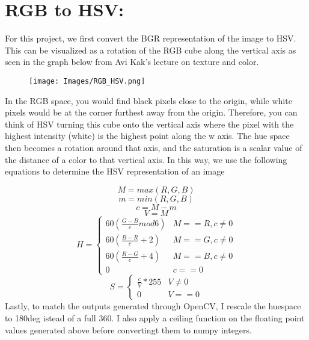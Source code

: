 \documentclass{article}
\begin{document}
\section{RGB to HSV:}
For this project, we first convert the BGR representation of the image to HSV. This can be visualized as a rotation of the RGB cube along the vertical axis as seen in the graph below from Avi Kak's lecture on texture and color.
\begin{figure}[H]
    \centering
    \texttt{[image: Images/RGB\_HSV.png]}
    \label{fig:HSV_conversion}
\end{figure}
In the RGB space, you would find black pixels close to the origin, while white pixels would be at the corner furthest away from the origin. Therefore, you can think of HSV turning this cube onto the vertical axis where the pixel with the highest intensity (white) is the highest point along the w axis. The hue space then becomes a rotation around that axis, and the saturation is a scalar value of the distance of a color to that vertical axis. In this way, we use the following equations to determine the HSV representation of an image

\[M = max(R, G, B)\]
\[m = min(R, G, B)\]
\[c = M - m\]
\[V = M\]
\[H = \begin{cases}
    60 \left( \frac{G - B}{c} mod 6\right) & M == R, c \neq 0 \\
    60 \left( \frac{B - R}{c} + 2\right) & M == G, c \neq 0 \\
    60 \left( \frac{R - G}{c} + 4\right) & M == B, c \neq 0 \\
    0 & c == 0
\end{cases}\]
\[S = \begin{cases}
    \frac{c}{V} * 255 & V \neq 0 \\
    0 & V == 0
\end{cases}\]
Lastly, to match the outputs generated through OpenCV, I rescale the huespace to 180deg istead of a full 360. I also apply a ceiling function on the floating point values generated above before convertingt them to numpy integers.
\end{document}
